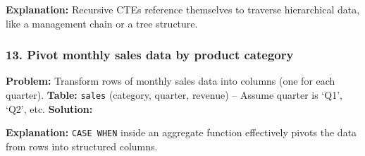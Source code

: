 \textbf{Explanation:} Recursive CTEs reference themselves to traverse
hierarchical data, like a management chain or a tree structure.

\subsubsection{13. Pivot monthly sales data by product
category}\label{pivot-monthly-sales-data-by-product-category}

\textbf{Problem:} Transform rows of monthly sales data into columns (one
for each quarter). \textbf{Table:} \texttt{sales} (category, quarter,
revenue) -- Assume quarter is `Q1', `Q2', etc. \textbf{Solution:}

\begin{Shaded}
\begin{Highlighting}[]
    \NormalTok{,}
    \NormalTok{(} \OperatorTok{=}    \NormalTok{) }
    \NormalTok{(} \OperatorTok{=}    \NormalTok{) }
    \NormalTok{(} \OperatorTok{=}    \NormalTok{) }
    \NormalTok{(} \OperatorTok{=}    \NormalTok{) }
  \NormalTok{;}
\end{Highlighting}
\end{Shaded}

\textbf{Explanation:} \texttt{CASE\ WHEN} inside an aggregate function
effectively pivots the data from rows into structured columns.

